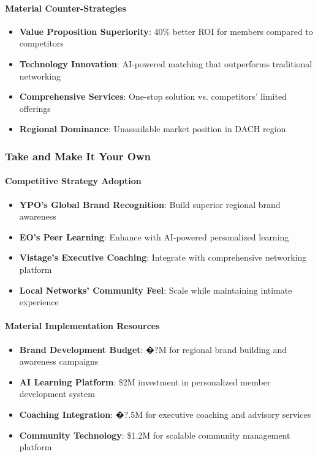 \paragraph{Material Counter-Strategies}
\begin{itemize}
    \item \textbf{Value Proposition Superiority}: 40\% better ROI for members compared to competitors
    \item \textbf{Technology Innovation}: AI-powered matching that outperforms traditional networking
    \item \textbf{Comprehensive Services}: One-stop solution vs. competitors' limited offerings
    \item \textbf{Regional Dominance}: Unassailable market position in DACH region
\end{itemize}

\subsubsection{Take and Make It Your Own}

\paragraph{Competitive Strategy Adoption}
\begin{itemize}
    \item \textbf{YPO's Global Brand Recognition}: Build superior regional brand awareness
    \item \textbf{EO's Peer Learning}: Enhance with AI-powered personalized learning
    \item \textbf{Vistage's Executive Coaching}: Integrate with comprehensive networking platform
    \item \textbf{Local Networks' Community Feel}: Scale while maintaining intimate experience
\end{itemize}

\paragraph{Material Implementation Resources}
\begin{itemize}
    \item \textbf{Brand Development Budget}: �?M for regional brand building and awareness campaigns
    \item \textbf{AI Learning Platform}: \$2M investment in personalized member development system
    \item \textbf{Coaching Integration}: �?.5M for executive coaching and advisory services
    \item \textbf{Community Technology}: \$1.2M for scalable community management platform
\end{itemize}

